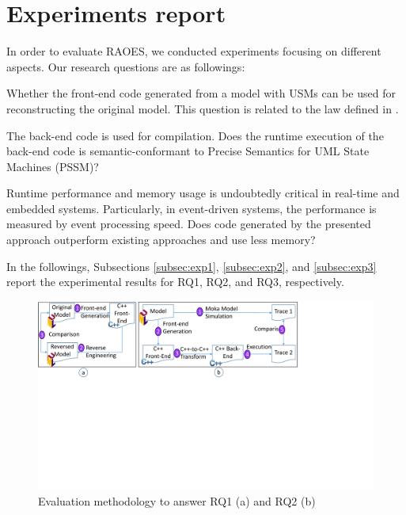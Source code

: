 \section{Experiments report}
\label{sec:exp}

In order to evaluate RAOES, we conducted experiments focusing on different aspects. 
Our research questions are as followings:
\begin{description}[\footnotesize]
	\item[\tb{RQ1}] %
	Whether the front-end code generated from a model with USMs can be used for reconstructing the original model. This question is related to the  law defined in \cite{foster_combinators_2007}.
	
	\item[\tb{RQ2}] The back-end code is used for compilation. 
	Does the runtime execution of the back-end code is semantic-conformant to Precise Semantics for UML State Machines (PSSM)? 
	
	\item[\tb{RQ3}] Runtime performance and memory usage is undoubtedly critical in real-time and embedded systems. Particularly, in event-driven systems, the performance is measured by event processing speed. Does code generated by the presented approach outperform existing approaches and use less memory?
\end{description} 

In the followings, Subsections \ref{subsec:exp1}, \ref{subsec:exp2}, and \ref{subsec:exp3} report the experimental results for RQ1, RQ2, and RQ3, respectively.

\begin{figure}
	\centering
	\includegraphics[clip, trim=0cm 11.4cm 7.65cm 0cm, width=\columnwidth]{figures/rq1-2evaluation}
	\caption{Evaluation methodology to answer RQ1 (a) and RQ2 (b)} 
	\label{fig:rq1-2evaluation}
\end{figure}

